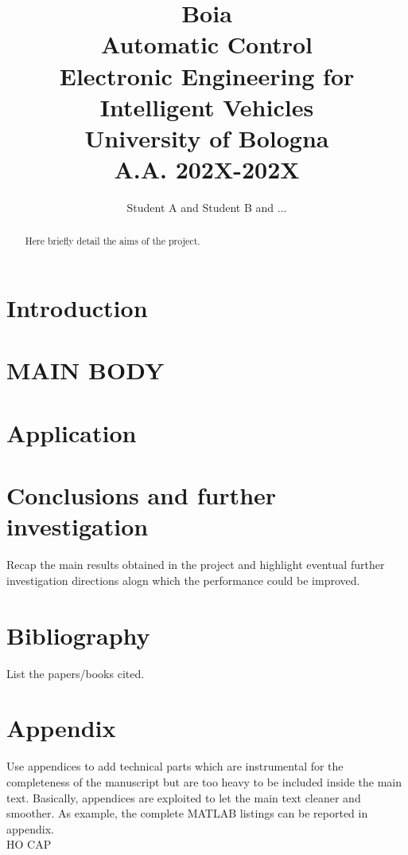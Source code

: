 \documentclass[]{report}
\title{{\huge  Boia} \\
{\small Automatic Control\\
Electronic Engineering for Intelligent Vehicles\\
University of Bologna\\
A.A. 202X-202X}}
\author{Student A and Student B and ...}
\begin{document}
\maketitle

\begin{abstract}
	Here briefly detail  the aims of the project.
\end{abstract}

\chapter{Introduction}


\chapter{MAIN BODY}


\chapter{Application}

\chapter{Conclusions and further investigation}
Recap the main results obtained in the project and highlight eventual further investigation directions alogn which the performance could be improved. 

\newpage
\chapter*{Bibliography}
List the papers/books cited.

\newpage
\appendix
\chapter*{Appendix}
Use appendices to add technical parts which are instrumental for the completeness of the manuscript but are too heavy to be included inside the main text. Basically, appendices are exploited to let the main text cleaner and smoother. As example, the complete MATLAB listings can be reported in appendix.\\

HO CAP
\end{document}
